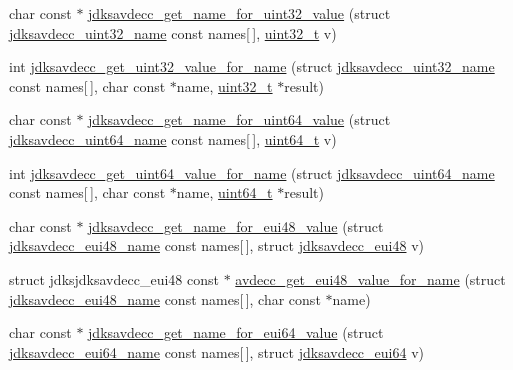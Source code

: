 \begin{DoxyCompactItemize}
\item 
char const $\ast$ \hyperlink{group__util_gaaabd45a243c0d81260bf2a761dc7f23c}{jdksavdecc\+\_\+get\+\_\+name\+\_\+for\+\_\+uint32\+\_\+value} (struct \hyperlink{structjdksavdecc__uint32__name}{jdksavdecc\+\_\+uint32\+\_\+name} const names\mbox{[}$\,$\mbox{]}, \hyperlink{parse_8c_a6eb1e68cc391dd753bc8ce896dbb8315}{uint32\+\_\+t} v)
\item 
int \hyperlink{group__util_gae8a9a7b3ebbc7c879b16e841e653a06b}{jdksavdecc\+\_\+get\+\_\+uint32\+\_\+value\+\_\+for\+\_\+name} (struct \hyperlink{structjdksavdecc__uint32__name}{jdksavdecc\+\_\+uint32\+\_\+name} const names\mbox{[}$\,$\mbox{]}, char const $\ast$name, \hyperlink{parse_8c_a6eb1e68cc391dd753bc8ce896dbb8315}{uint32\+\_\+t} $\ast$result)
\item 
char const $\ast$ \hyperlink{group__util_ga1bcc2a1a7a612ccdae6193288ac1fc53}{jdksavdecc\+\_\+get\+\_\+name\+\_\+for\+\_\+uint64\+\_\+value} (struct \hyperlink{structjdksavdecc__uint64__name}{jdksavdecc\+\_\+uint64\+\_\+name} const names\mbox{[}$\,$\mbox{]}, \hyperlink{parse_8c_aec6fcb673ff035718c238c8c9d544c47}{uint64\+\_\+t} v)
\item 
int \hyperlink{group__util_ga34e77dc5fe6af6795e56991e7b9677e6}{jdksavdecc\+\_\+get\+\_\+uint64\+\_\+value\+\_\+for\+\_\+name} (struct \hyperlink{structjdksavdecc__uint64__name}{jdksavdecc\+\_\+uint64\+\_\+name} const names\mbox{[}$\,$\mbox{]}, char const $\ast$name, \hyperlink{parse_8c_aec6fcb673ff035718c238c8c9d544c47}{uint64\+\_\+t} $\ast$result)
\item 
char const $\ast$ \hyperlink{group__util_ga23aabc55d9c49940559695274381ebf7}{jdksavdecc\+\_\+get\+\_\+name\+\_\+for\+\_\+eui48\+\_\+value} (struct \hyperlink{structjdksavdecc__eui48__name}{jdksavdecc\+\_\+eui48\+\_\+name} const names\mbox{[}$\,$\mbox{]}, struct \hyperlink{structjdksavdecc__eui48}{jdksavdecc\+\_\+eui48} v)
\item 
struct jdksjdksavdecc\+\_\+eui48 const $\ast$ \hyperlink{group__util_ga4b3f19e7981771691503ed10f8b797f3}{avdecc\+\_\+get\+\_\+eui48\+\_\+value\+\_\+for\+\_\+name} (struct \hyperlink{structjdksavdecc__eui48__name}{jdksavdecc\+\_\+eui48\+\_\+name} const names\mbox{[}$\,$\mbox{]}, char const $\ast$name)
\item 
char const $\ast$ \hyperlink{group__util_gaaae54dbec3243caca35c0a17e9427754}{jdksavdecc\+\_\+get\+\_\+name\+\_\+for\+\_\+eui64\+\_\+value} (struct \hyperlink{structjdksavdecc__eui64__name}{jdksavdecc\+\_\+eui64\+\_\+name} const names\mbox{[}$\,$\mbox{]}, struct \hyperlink{structjdksavdecc__eui64}{jdksavdecc\+\_\+eui64} v)

\end{DoxyCompactItemize}
